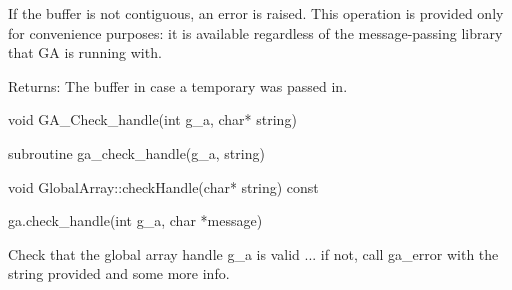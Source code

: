 \documentclass[12pt]{article}
\begin{document}
\begin{pydesc}
If the buffer is not contiguous, an error is raised. This operation is provided
only for convenience purposes: it is available regardless of the
message-passing library that GA is running with.

Returns: The buffer in case a temporary was passed in.
\end{pydesc}


\begin{capi}
\begin{ccode}
void GA_Check_handle(int g_a, char* string)
\end{ccode}
\begin{funcargs}
\end{funcargs}
\end{capi}

\begin{fapi}
\begin{fcode}
subroutine ga_check_handle(g_a, string)
\end{fcode}
\begin{funcargs}
\end{funcargs}
\end{fapi}

\begin{cxxapi}
\begin{cxxcode}
void GlobalArray::checkHandle(char* string) const
\end{cxxcode}
\begin{funcargs}
\end{funcargs}
\end{cxxapi}

\begin{pyapi}
\begin{pycode}
ga.check_handle(int g_a, char *message)
\end{pycode}
\begin{funcargs}
\end{funcargs}
\end{pyapi}

\local

\begin{desc}

Check that the global array handle g_a is valid ... if not, call ga_error with
the string provided and some more info.

\end{desc}
\end{document}
